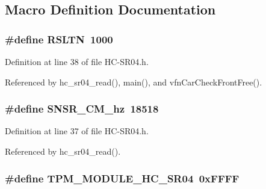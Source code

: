 \subsection{Macro Definition Documentation}
\subsubsection[{\texorpdfstring{R\+S\+L\+TN}{RSLTN}}]{\setlength{\rightskip}{0pt plus 5cm}\#define R\+S\+L\+TN~1000}\hypertarget{_h_c-_s_r04_8h_adceb57dbad104ccbabb20f547f7bf96e}{}\label{_h_c-_s_r04_8h_adceb57dbad104ccbabb20f547f7bf96e}


Definition at line 38 of file H\+C-\/\+S\+R04.\+h.



Referenced by hc\+\_\+sr04\+\_\+read(), main(), and vfn\+Car\+Check\+Front\+Free().

\subsubsection[{\texorpdfstring{S\+N\+S\+R\+\_\+1\+C\+M\+\_\+hz}{SNSR_1CM_hz}}]{\setlength{\rightskip}{0pt plus 5cm}\#define S\+N\+S\+R\+\_\+C\+M\+\_\+hz~18518}\hypertarget{_h_c-_s_r04_8h_a42870839300c77ad5fb33e288ec6825e}{}\label{_h_c-_s_r04_8h_a42870839300c77ad5fb33e288ec6825e}


Definition at line 37 of file H\+C-\/\+S\+R04.\+h.



Referenced by hc\+\_\+sr04\+\_\+read().

\subsubsection[{\texorpdfstring{T\+P\+M\+\_\+\+M\+O\+D\+U\+L\+E\+\_\+\+H\+C\+\_\+\+S\+R04}{TPM_MODULE_HC_SR04}}]{\setlength{\rightskip}{0pt plus 5cm}\#define T\+P\+M\+\_\+\+M\+O\+D\+U\+L\+E\+\_\+\+H\+C\+\_\+\+S\+R04~0x\+F\+F\+FF}\hypertarget{_h_c-_s_r04_8h_a6bb158e28450d26df9b05389b19fa28d}{}\label{_h_c-_s_r04_8h_a6bb158e28450d26df9b05389b19fa28d}


